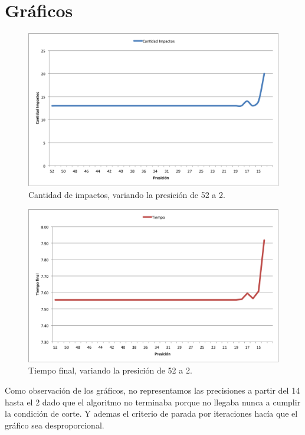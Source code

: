 \documentclass[10pt, a4paper,english,spanish]{article}
\begin{document}
\newpage

\section{Gráficos}

\begin{figure}[H]
  \centering
  \includegraphics[scale=0.65]{graficos/extra-cantidad_impactos.png}
  \caption{Cantidad de impactos, variando la presición de 52 a 2.}
\end{figure}

\begin{figure}[H]
  \centering
  \includegraphics[scale=0.65]{graficos/extra-tiempo.png}
  \caption{Tiempo final, variando la presición de 52 a 2.}
\end{figure}



Como observación de los gráficos, no representamos las precisiones a partir del 14 hasta el 2 dado que el algoritmo no terminaba porque no llegaba nunca a cumplir la condición de corte. Y ademas el criterio de parada por iteraciones hacía que el gráfico sea desproporcional.
\end{document}
